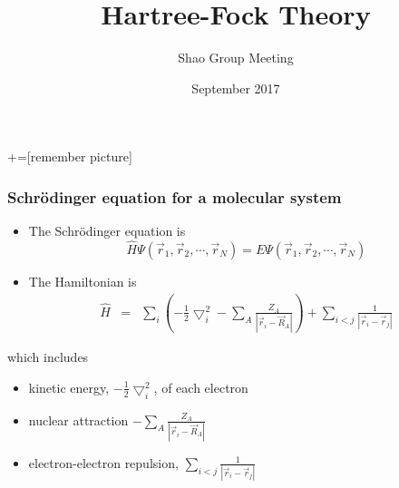 \documentclass[handout]{beamer} %
\author[]{Shao Group Meeting}
\institute[]{University of Oklahoma }
\title[]{Hartree-Fock Theory}
\date[September 2017]{September 2017}
\begin{document}

+=[remember picture]

\everymath{\displaystyle}

\frame{\titlepage}

\begin{frame}
\frametitle{Schr\"{o}dinger equation for a molecular system}

\begin{itemize}
\item \small{The Schr\"{o}dinger equation is}
\begin{equation*}
\hat{H} \Psi(\vec{r}_1, \vec{r}_2, \cdots, \vec{r}_N)  = E \Psi(\vec{r}_1, \vec{r}_2, \cdots, \vec{r}_N)  
\end{equation*}
\item The Hamiltonian is
\begin{eqnarray*}
\hat{H} & = &  \sum_i \left(- \frac{1}{2} \bigtriangledown_i^2  - \sum_A \frac{Z_A}{\left| \vec{r}_i - \vec{R}_A \right| } \right) +  \sum_{i < j} \frac{1}{\left| \vec{r}_{i} - \vec{r}_j \right| }   \end{eqnarray*}
\end{itemize}
which includes 
\begin{itemize}
\item \small{kinetic energy, $- \frac{1}{2} \bigtriangledown_i^2$, of each electron}
\item nuclear attraction $- \sum_A \frac{Z_A}{\left| \vec{r}_i - \vec{R}_A \right| } $
\item electron-electron repulsion, $ \sum_{i < j} \frac{1}{\left| \vec{r}_{i} - \vec{r}_j \right| } $ 
\end{itemize}
\end{frame}
\end{document}

